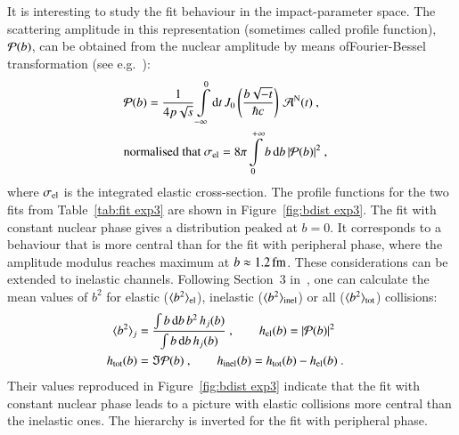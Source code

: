 It is interesting to study the fit behaviour in the impact-parameter space. The scattering amplitude in this representation (sometimes called profile function), ${\cal P}(b)$, can be obtained from the nuclear amplitude by means of\Break Fourier-Bessel transformation (see e.g.~\cite{klk02}):
\begin{equation}
\label{eq:prof fun}
	\begin{aligned}
		&{\cal P}(b) = {1\over 4 p \sqrt s} \int\limits_{-\infty}^0 \d t\,J_0\left(b\sqrt{-t}\over \hbar c\right)\,{\cal A}^{\rm N}(t)\ ,\cr
		&\hbox{normalised that } {\sigma_{\rm el} = 8\pi \int\limits_0^{+\infty} b\, \d b\, |{\cal P}(b)|^2}\ ,\cr
	\end{aligned}
\end{equation}
where $\sigma_{\rm el}$ is the integrated elastic cross-section. The profile functions for the two fits from Table~\ref{tab:fit exp3} are shown in Figure~\ref{fig:bdist exp3}. The fit with constant nuclear phase gives a distribution peaked at $b=0$. It corresponds to a behaviour that is more central than for the fit with peripheral phase, where the amplitude modulus reaches maximum at $b\approx 1.2\,{\rm fm}$. These considerations can be extended to inelastic channels. Following Section~3 in~\cite{klk02}, one can calculate the mean values of $b^2$ for elastic ($\langle b^2\rangle_{\rm el}$), inelastic ($\langle b^2\rangle_{\rm inel}$) or all ($\langle b^2\rangle_{\rm tot}$) collisions:
\begin{equation}
\label{eq:ms b}
	\begin{aligned}
		\langle b^2\rangle_j &= {
			\int b\,\d b\,b^2\, h_j(b)
			\over
			\int b\,\d b\, h_j(b)
		}\ ,\qquad h_{\rm el}(b) = |{\cal P}(b)|^2\cr
		h_{\rm tot}(b) &= \Im {\cal P}(b)\ ,\qquad
		h_{\rm inel}(b) = h_{\rm tot}(b) - h_{\rm el}(b)\ .\cr
	\end{aligned}
\end{equation}
Their values reproduced in Figure~\ref{fig:bdist exp3} indicate that the fit with constant nuclear phase leads to a picture with elastic collisions more central than the inelastic ones. The hierarchy is inverted for the fit with peripheral phase.

